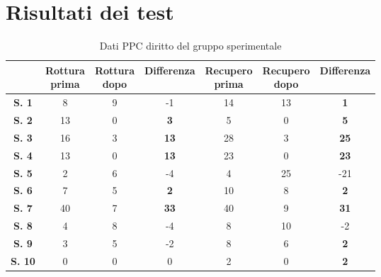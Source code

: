 \chapter{Risultati dei test}

\begin{table}[H]
\begin{center}
\begin{tabular}{|c|c|c|c|c|c|c|} \hline
{\textbf{}} & \pbox{20cm}{\textbf{Rottura} \\ \textbf{prima}} & \pbox{20cm}{\textbf{Rottura} \\ \textbf{dopo}} & \textbf{Differenza} & \pbox{20cm}{\textbf{Recupero} \\ \textbf{prima}} & \pbox{20cm}{\textbf{Recupero} \\ \textbf{dopo}} & \textbf{Differenza} \\ \hline
\textbf{S. 1} & 8 & 9 & -1 & 14 & 13 & \textbf{1} \\ \hline
\textbf{S. 2} & 13 & 0 & \textbf{3} & 5 & 0 & \textbf{5} \\ \hline
\textbf{S. 3} & 16 & 3 & \textbf{13} & 28 & 3 & \textbf{25}  \\ \hline
\textbf{S. 4} & 13 & 0 & \textbf{13} & 23 & 0 & \textbf{23}  \\ \hline
\textbf{S. 5} & 2 & 6 & -4 & 4 & 25 & -21  \\ \hline
\textbf{S. 6} & 7 & 5 & \textbf{2} & 10 & 8 & \textbf{2} \\ \hline
\textbf{S. 7} & 40 & 7 & \textbf{33} & 40 & 9 & \textbf{31} \\ \hline
\textbf{S. 8} & 4 & 8 & -4 & 8 & 10 & -2  \\ \hline
\textbf{S. 9} & 3 & 5 & -2 & 8 & 6 & \textbf{2} \\ \hline
\textbf{S. 10} & 0 & 0 & 0 & 2 & 0 & \textbf{2} \\ \hline

\end{tabular}
\end{center}
\caption{Dati PPC diritto del gruppo sperimentale}
\end{table}
\\\ \\\ \\\ \\\ \\\ \\\ \\\ \\\ \\\ \\\ \\\ \\\ \\\ \\\

